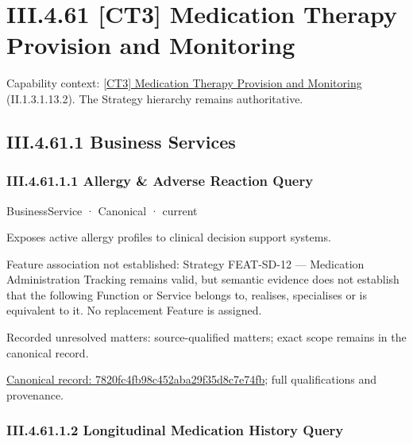 \section*{III.4.61 [CT3] Medication Therapy Provision and Monitoring}
\label{navigation:III.4.61}

{\small Capability context: \hyperref[element:d1821b4f6d5746f9a697dfe3b792a186]{[CT3] Medication Therapy Provision and Monitoring} (II.1.3.1.13.2). The Strategy hierarchy remains authoritative.}\par
\subsection*{III.4.61.1 Business Services}
\label{navigation:III.4.61.1}

\subsubsection*{III.4.61.1.1 Allergy \& Adverse Reaction Query}
\label{navigation:III.4.61.1.1}

\label{element:7820fc4fb98c452aba29f35d8c7e74fb}
{\small BusinessService · Canonical · current}\par

Exposes active allergy profiles to clinical decision support systems.



Feature association not established: Strategy FEAT-SD-12 — Medication Administration Tracking remains valid, but semantic evidence does not establish that the following Function or Service belongs to, realises, specialises or is equivalent to it. No replacement Feature is assigned.


{\small Recorded unresolved matters: source-qualified matters; exact scope remains in the canonical record.}\par
{\footnotesize \href{../../../../continuum/business/business-service/7820fc4fb98c452aba29f35d8c7e74fb.md}{Canonical record: 7820fc4fb98c452aba29f35d8c7e74fb}; full qualifications and provenance.}\par
\subsubsection*{III.4.61.1.2 Longitudinal Medication History Query}
\label{navigation:III.4.61.1.2}

